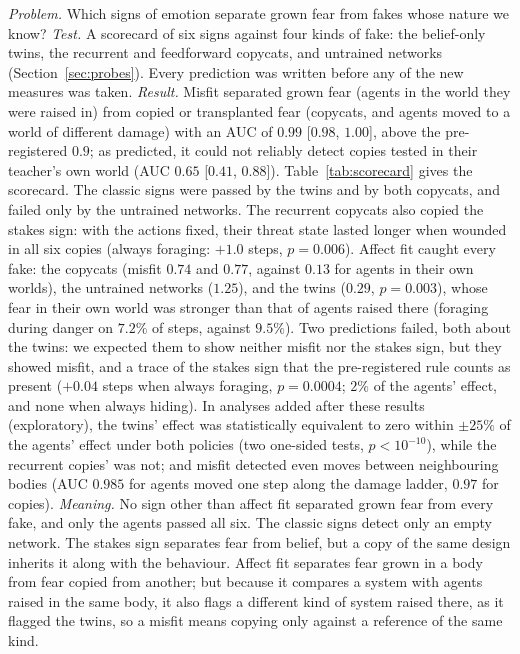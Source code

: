 \documentclass[11pt]{article}
\begin{document}
\emph{Problem.} Which signs of emotion separate grown fear from fakes whose nature we know? \emph{Test.} A scorecard of six signs against four kinds of fake: the belief-only twins, the recurrent and feedforward copycats, and untrained networks (Section~\ref{sec:probes}). Every prediction was written before any of the new measures was taken. \emph{Result.} Misfit separated grown fear (agents in the world they were raised in) from copied or transplanted fear (copycats, and agents moved to a world of different damage) with an AUC of $0.99$ [$0.98$, $1.00$], above the pre-registered $0.9$; as predicted, it could not reliably detect copies tested in their teacher's own world (AUC $0.65$ [$0.41$, $0.88$]). Table~\ref{tab:scorecard} gives the scorecard. The classic signs were passed by the twins and by both copycats, and failed only by the untrained networks. The recurrent copycats also copied the stakes sign: with the actions fixed, their threat state lasted longer when wounded in all six copies (always foraging: $+1.0$ steps, $p=0.006$). Affect fit caught every fake: the copycats (misfit $0.74$ and $0.77$, against $0.13$ for agents in their own worlds), the untrained networks ($1.25$), and the twins ($0.29$, $p=0.003$), whose fear in their own world was stronger than that of agents raised there (foraging during danger on $7.2\%$ of steps, against $9.5\%$). Two predictions failed, both about the twins: we expected them to show neither misfit nor the stakes sign, but they showed misfit, and a trace of the stakes sign that the pre-registered rule counts as present ($+0.04$ steps when always foraging, $p=0.0004$; $2\%$ of the agents' effect, and none when always hiding). In analyses added after these results (exploratory), the twins' effect was statistically equivalent to zero within $\pm25\%$ of the agents' effect under both policies (two one-sided tests, $p<10^{-10}$), while the recurrent copies' was not; and misfit detected even moves between neighbouring bodies (AUC $0.985$ for agents moved one step along the damage ladder, $0.97$ for copies). \emph{Meaning.} No sign other than affect fit separated grown fear from every fake, and only the agents passed all six. The classic signs detect only an empty network. The stakes sign separates fear from belief, but a copy of the same design inherits it along with the behaviour. Affect fit separates fear grown in a body from fear copied from another; but because it compares a system with agents raised in the same body, it also flags a different kind of system raised there, as it flagged the twins, so a misfit means copying only against a reference of the same kind.
\end{document}
